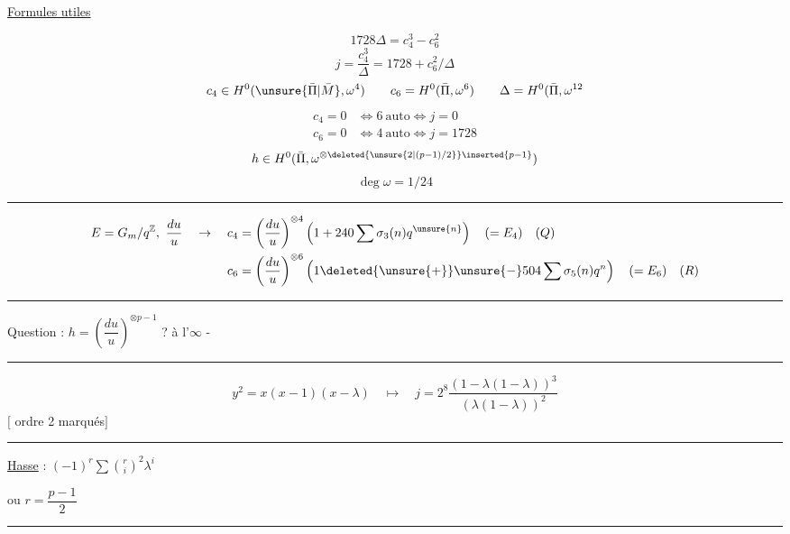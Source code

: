 \uline{Formules utiles}

\[
1728\Delta=c_4^3-c_6^2
\]
\[
j=\frac{c_4^3}{\Delta}=1728+c_6^2/\Delta
\]
\[
c_4\in H^0(\unsure{\bar{\Pi}|\bar{M}},\omega^4)\qquad
c_6=H^0(\bar{\Pi},\omega^6)\qquad \Delta=H^0(\bar{\Pi},\omega^{12}
\]
\[
\begin{aligned}
c_4=0&\Longleftrightarrow 6\ \text{auto}\Longleftrightarrow j=0\\
c_6=0&\Longleftrightarrow 4\ \text{auto}\Longleftrightarrow j=1728
\end{aligned}
\]
\[
h\in H^0(\bar{\Pi},\omega^{\otimes\deleted{\unsure{2|(p-1)/2}}\inserted{p-1}})
\]
\[
\deg\omega=1/24
\]
\begin{center}\rule{1.4cm}{0.3pt}\end{center}
\[
\begin{aligned}
E=G_m/q^{\mathbb Z},\ \frac{du}{u}\quad\to\quad
c_4&=\left(\frac{du}{u}\right)^{\otimes4}
\left(1+240\sum\sigma_3(n)q^{\unsure{n}}\right)\quad(=E_4)\quad(Q)\\
c_6&=\left(\frac{du}{u}\right)^{\otimes6}
\left(1\deleted{\unsure{+}}\unsure{-}504\sum\sigma_5(n)q^n\right)\quad(=E_6)\quad(R)
\end{aligned}
\]
\begin{center}\rule{1.4cm}{0.3pt}\end{center}

Question : $h=\left(\dfrac{du}{u}\right)^{\otimes p-1}$ ? à l'$\infty$ -

\begin{center}\rule{1.6cm}{0.3pt}\end{center}
\[
y^2=x(x-1)(x-\lambda)\quad\longmapsto\quad
j=2^8\frac{(1-\lambda(1-\lambda))^3}{(\lambda(1-\lambda))^2}
\]
$[$ ordre 2 marqués$]$
\begin{center}\rule{1.8cm}{0.3pt}\end{center}

\uline{Hasse} : $\displaystyle(-1)^r\sum\binom{r}{i}^2\lambda^i$

ou $r=\dfrac{p-1}{2}$

\begin{center}\rule{1.6cm}{0.3pt}\end{center}
